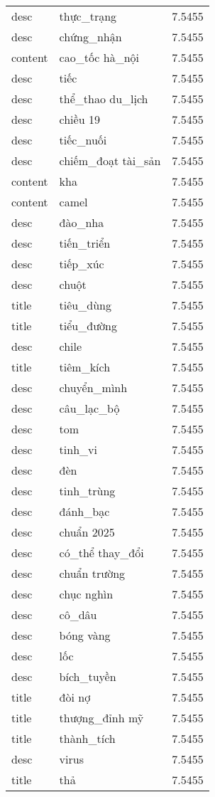 \documentclass{article}
\begin{document}
\begin{tabular}{lll}
desc & thực\_trạng & 7.5455\\
desc & chứng\_nhận & 7.5455\\
content & cao\_tốc hà\_nội & 7.5455\\
desc & tiếc & 7.5455\\
desc & thể\_thao du\_lịch & 7.5455\\
desc & chiều 19 & 7.5455\\
desc & tiếc\_nuối & 7.5455\\
desc & chiếm\_đoạt tài\_sản & 7.5455\\
content & kha & 7.5455\\
content & camel & 7.5455\\
desc & đào\_nha & 7.5455\\
desc & tiến\_triển & 7.5455\\
desc & tiếp\_xúc & 7.5455\\
desc & chuột & 7.5455\\
title & tiêu\_dùng & 7.5455\\
title & tiểu\_đường & 7.5455\\
desc & chile & 7.5455\\
title & tiêm\_kích & 7.5455\\
desc & chuyển\_mình & 7.5455\\
desc & câu\_lạc\_bộ & 7.5455\\
desc & tom & 7.5455\\
desc & tinh\_vi & 7.5455\\
desc & đèn & 7.5455\\
desc & tinh\_trùng & 7.5455\\
desc & đánh\_bạc & 7.5455\\
desc & chuẩn 2025 & 7.5455\\
desc & có\_thể thay\_đổi & 7.5455\\
desc & chuẩn trường & 7.5455\\
desc & chục nghìn & 7.5455\\
desc & cô\_dâu & 7.5455\\
desc & bóng vàng & 7.5455\\
desc & lốc & 7.5455\\
desc & bích\_tuyền & 7.5455\\
title & đòi nợ & 7.5455\\
title & thượng\_đỉnh mỹ & 7.5455\\
title & thành\_tích & 7.5455\\
desc & virus & 7.5455\\
title & thả & 7.5455\\

\end{tabular}
\end{document}
